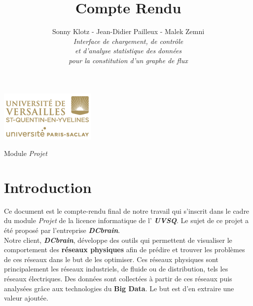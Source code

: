 

\title{\vspace{\fill}\textbf{\Huge Compte Rendu}}
\author{
	Sonny Klotz - Jean-Didier Pailleux - Malek Zemni
	\vspace{2em}\\
	\textit{Interface de chargement, de contrôle}\\\textit{et d’analyse statistique des données}\\\textit{pour la constitution d’un graphe de flux}
	\vspace{2em}
}


\clearpage
\maketitle\vspace{9em}
\begin{center}\includegraphics[scale=0.7]{../Cahier/logo.png}\end{center}
\begin{flushright}Module \textit{Projet}\end{flushright}
\newpage
\tableofcontents
\newpage\clearpage{}

	\section*{Introduction}
	Ce document est le compte-rendu final de notre travail qui s'inscrit dans le cadre du module \textit{Projet} de la licence informatique de l' \textit{\textbf{UVSQ}}. Le sujet de ce projet a été proposé par l'entreprise \textit{\textbf{DCbrain}}.\\
	
	Notre client, \textit{\textbf{DCbrain}}, développe des outils qui permettent de visualiser le comportement des \textbf{réseaux physiques} afin de prédire et trouver les problèmes de ces réseaux dans le but de les optimiser. Ces réseaux physiques sont principalement les réseaux industriels, de fluide ou de distribution, tels les réseaux électriques. Des données sont collectées à partir de ces réseaux puis analysées grâce aux technologies du \textbf{Big Data}. Le but est d'en extraire une valeur ajoutée.\\
	
